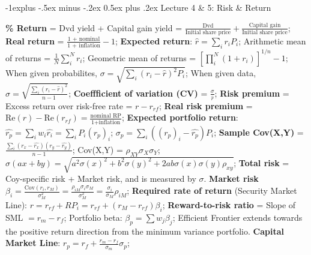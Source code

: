 \documentclass[10pt,landscape]{article}
\makeatletter
\renewcommand{\subsection}{\@startsection{subsection}{2}{0mm}%
                                {-1explus -.5ex minus -.2ex}%
                                {0.5ex plus .2ex}%
                                {\normalfont\normalsize\bfseries}}
\makeatother
\begin{document}
\begin{multicols}{3}
\subsection{Lecture 4 \& 5: Risk \& Return}

\textbf{\% Return} = Dvd yield + Capital gain yield = 
$\frac{\text{Dvd}}{\text{Initial share price}} + \frac{\text{Capital gain}}
{\text{Initial share price}}$;
\textbf{Real return} = $\frac{\text{1 + nominal}}{\text{1 + inflation}}-1$;
\textbf{Expected return}: $\hat{r} = \sum_i r_i P_i$;
Arithmetic mean of returns = $\frac{1}{N}\sum_i^N r_i$;
Geometric mean of returns = $[\prod_i^N (1+r_i)]^{1/n} - 1$;
When given probabilites, $\sigma = \sqrt{\sum_i (r_i - \hat{r})^2 P_i}$;
When given data, $\sigma = \sqrt{\frac{\sum_i (r_i - \hat{r})^2}{n-1}}$;
\textbf{Coeffficient of variation (CV)} = $\frac{\sigma}{\hat{r}}$;
\textbf{Risk premium} = Excess return over risk-free rate = $r - r_{rf}$;
\textbf{Real risk premium} = $\text{Re}(r) - \text{Re}(r_{rf}) =
\frac{\text{nominal RP}}{\text{1+inflation}}$;
\textbf{Expected portfolio return}: $\hat{r_p} = \sum_i w_i \hat{r_i} = \sum_i
P_i (r_p)_i$;
$\sigma_p = \sum_i ((r_p)_i - \hat{r_p})P_i$;
\textbf{Sample Cov(X,Y)} = $\frac{\sum_i (r_x - \hat{r_x})(r_y - \hat{r_y})}{n-1}$;
Cov(X,Y) = $\rho_{XY} \sigma_X \sigma_Y$;
$\sigma(ax+by) = \sqrt{a^2 \sigma(x)^2 + b^2\sigma(y)^2 +
	2ab\sigma(x)\sigma(y)\rho_{xy}}$;
\textbf{Total risk} = Coy-specific risk + Market risk, and is measured by $\sigma$.
\textbf{Market risk} $\beta_i = \frac{\text{Cov}(r_i, r_M)}{\sigma_M^2}
= \frac{\rho_{iM} \sigma_i \sigma_M}{\sigma_M^2}
= \frac{\sigma_i}{\sigma_M}\rho_{iM}$;
\textbf{Required rate of return} (Security Market Line): $r = r_{rf} + RP_i =
	r_{rf} + (r_M - r_{rf})\beta_i$;
\textbf{Reward-to-risk ratio} = Slope of SML $= r_m - r_f$;
Portfolio beta: $\beta_p = \sum w_j \beta_j$;
Efficient Frontier extends towards the positive return direction from the
	minimum variance portfolio.
\textbf{Capital Market Line}: $r_p = r_f + \frac{r_m - r_f}{\sigma_m} \sigma_p$;

%
%

\end{multicols}
\end{document}
